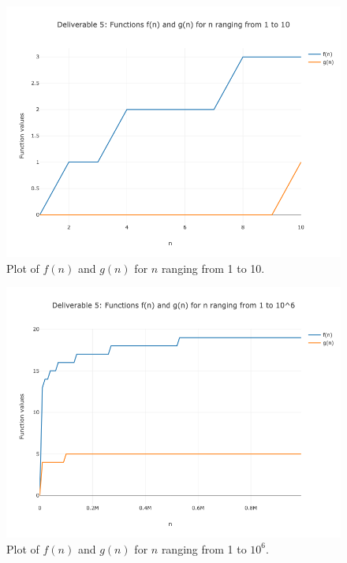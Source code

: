 \documentclass{article}
\begin{document}
\begin{figure}[H]
    \centering
    \includegraphics[width=\textwidth]{Deliverable 5: plot_1_to_10.png}
    \caption{Plot of $f(n)$ and $g(n)$ for $n$ ranging from 1 to 10.}
    \label{del5: plot_1_to_10}
\end{figure}

\begin{figure}[H]
    \centering
    \includegraphics[width=\textwidth]{Deliverable 5: plot_1_to_1000000.png}
    \caption{Plot of $f(n)$ and $g(n)$ for $n$ ranging from 1 to $10^6$.}
    \label{del5: plot_1_to10^6}
\end{figure}
\end{document}
